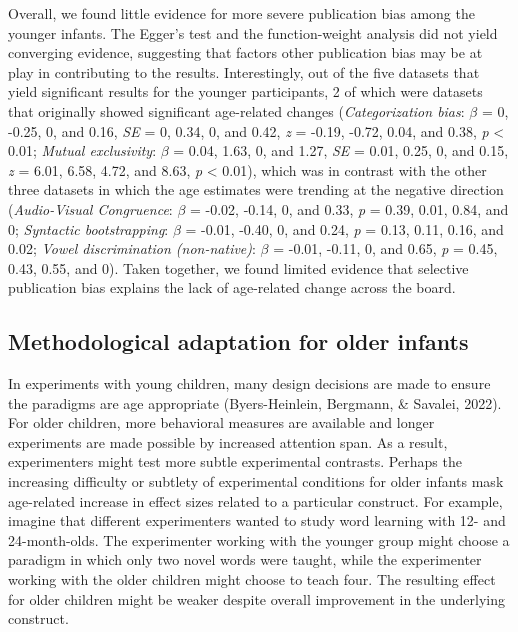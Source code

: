 \documentclass[
  man]{apa6}
\begin{document}
Overall, we found little evidence for more severe publication bias among the younger infants. The Egger's test and the function-weight analysis did not yield converging evidence, suggesting that factors other publication bias may be at play in contributing to the results. Interestingly, out of the five datasets that yield significant results for the younger participants, 2 of which were datasets that originally showed significant age-related changes (\emph{Categorization bias}: \(\beta\) = 0, -0.25, 0, and 0.16, \emph{SE} = 0, 0.34, 0, and 0.42, \emph{z} = -0.19, -0.72, 0.04, and 0.38, \emph{p} \textless{} 0.01; \emph{Mutual exclusivity}: \(\beta\) = 0.04, 1.63, 0, and 1.27, \emph{SE} = 0.01, 0.25, 0, and 0.15, \emph{z} = 6.01, 6.58, 4.72, and 8.63, \emph{p} \textless{} 0.01), which was in contrast with the other three datasets in which the age estimates were trending at the negative direction (\emph{Audio-Visual Congruence}: \(\beta\) = -0.02, -0.14, 0, and 0.33, \emph{p} = 0.39, 0.01, 0.84, and 0; \emph{Syntactic bootstrapping}: \(\beta\) = -0.01, -0.40, 0, and 0.24, \emph{p} = 0.13, 0.11, 0.16, and 0.02; \emph{Vowel discrimination (non-native)}: \(\beta\) = -0.01, -0.11, 0, and 0.65, \emph{p} = 0.45, 0.43, 0.55, and 0). Taken together, we found limited evidence that selective publication bias explains the lack of age-related change across the board.

\hypertarget{methodological-adaptation-for-older-infants}{%
\subsection{Methodological adaptation for older infants}\label{methodological-adaptation-for-older-infants}}

In experiments with young children, many design decisions are made to ensure the paradigms are age appropriate (Byers-Heinlein, Bergmann, \& Savalei, 2022). For older children, more behavioral measures are available and longer experiments are made possible by increased attention span. As a result, experimenters might test more subtle experimental contrasts. Perhaps the increasing difficulty or subtlety of experimental conditions for older infants mask age-related increase in effect sizes related to a particular construct. For example, imagine that different experimenters wanted to study word learning with 12- and 24-month-olds. The experimenter working with the younger group might choose a paradigm in which only two novel words were taught, while the experimenter working with the older children might choose to teach four. The resulting effect for older children might be weaker despite overall improvement in the underlying construct.
\end{document}
